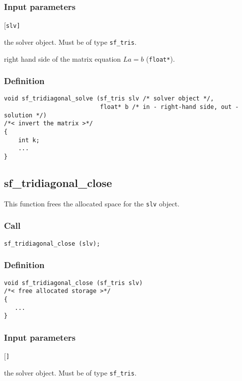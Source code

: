 \subsubsection*{Input parameters}
\begin{desclist}{\tt }{\quad}[\tt slv]
   \setlength\itemsep{0pt}
   \item[slv] the solver object. Must be of type \texttt{sf\_tris}. 
   \item[b]   right hand side of the matrix equation $La=b$ (\texttt{float*}).
\end{desclist}

\subsubsection*{Definition}
\begin{verbatim}
void sf_tridiagonal_solve (sf_tris slv /* solver object */, 
                           float* b /* in - right-hand side, out - solution */)
/*< invert the matrix >*/
{
    int k;
    ...
}
\end{verbatim}




\subsection{{sf\_tridiagonal\_close}}
This function frees the allocated space for the \texttt{slv} object.

\subsubsection*{Call}
\begin{verbatim}sf_tridiagonal_close (slv);\end{verbatim}

\subsubsection*{Definition}
\begin{verbatim}
void sf_tridiagonal_close (sf_tris slv)
/*< free allocated storage >*/
{
   ...
}
\end{verbatim}

\subsubsection*{Input parameters}
\begin{desclist}{\tt }{\quad}[\tt ]
   \setlength\itemsep{0pt}
   \item[slv] the solver object. Must be of type \texttt{sf\_tris}.
\end{desclist}





